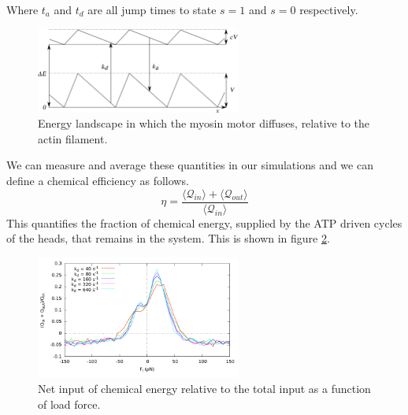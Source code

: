 \documentclass[aps,pre,onecolumn,showpacs,showkeys,a4paper]{revtex4}
\begin{document}
Where $t_a$ and $t_d$ are all jump times to state $s=1$ and $s=0$ respectively. 
\begin{figure}[h]
\centering
\includegraphics[width=0.6\textwidth,height=!]{energy}
\caption{Energy landscape in which the myosin motor diffuses, relative to the actin filament.}
\label{Fig: energy}
\end{figure}
 We can measure and average these quantities in our simulations and we can define a chemical efficiency as follows.
\begin{equation}
\eta = \frac{\langle\mathcal Q_{in}\rangle+\langle\mathcal Q_{out}\rangle}{\langle\mathcal Q_{in}\rangle}
\end{equation}
This quantifies the fraction of chemical energy, supplied by the ATP driven cycles of the heads, that remains in the system. 
This is shown in figure \ref{Fig: chem}.
\begin{figure}[h]
\centering
\includegraphics[width=0.6\textwidth,height=!]{chemical_cycle}
\caption{Net input of chemical energy relative to the total input as a function of load force.}
\label{Fig: chem}
\end{figure}
\end{document}

